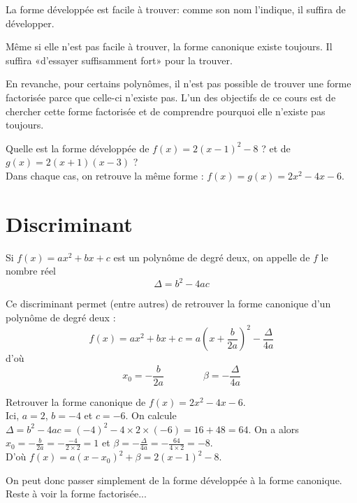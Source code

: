 \documentclass[cours]{lycee-deveaux}
\begin{document}
La forme développée est facile à trouver:
comme son nom l'indique, il suffira de développer.

Même si elle n'est pas facile à trouver, la forme canonique existe toujours.
Il suffira «d'essayer suffisamment fort» pour la trouver.

En revanche, pour certains polynômes, il n'est pas possible de trouver une forme
factorisée parce que celle-ci n'existe pas. L'un des objectifs de ce cours
est de chercher cette forme factorisée et de comprendre pourquoi elle n'existe pas toujours.

\begin{exemple}
  Quelle est la forme développée de  $f(x)= 2(x-1)^2-8$ ?
  et de $g(x) = 2(x+1)(x-3)$ ?\\
  Dans chaque cas, on retrouve la même forme : $f(x) = g(x) = 2x^2-4x-6$.
\end{exemple}

%
%
%
%
%
\section{Discriminant}

\begin{definition}
  \label{definition-discriminant}
  Si $f(x) = ax^2+bx+c$ est un polynôme de degré deux, on appelle
   de $f$ le nombre réel
  \[
  \Delta = b^2-4ac
  \]
\end{definition}

Ce discriminant permet (entre autres) de retrouver la forme canonique 
d'un polynôme de degré deux :
\[
f(x) = ax^2+bx+c = a\left(x+\frac{b}{2a}\right)^2-\frac{\Delta}{4a}
\]
d'où 
\[
x_0 = -\frac{b}{2a} \qquad \qquad \beta = -\frac{\Delta}{4a}
\]

\begin{exemple}
  Retrouver la forme canonique de $f(x) = 2x^2-4x-6$.\\
  Ici, $a=2$, $b=-4$ et $c=-6$. On calcule $\Delta = b^2-4ac = (-4)^2-4\times 2\times (-6) = 16+48=64$.
  On a alors $x_0 = -\frac{b}{2a} = -\frac{-4}{2\times 2} = 1$ et
  $\beta = -\frac{\Delta}{4a} = -\frac{64}{4\times 2} = -8$.\\
  D'où $f(x) = a(x-x_0)^2+\beta = 2(x-1)^2-8$.
\end{exemple}

On peut donc passer simplement de la forme développée à la forme canonique.
Reste à voir la forme factorisée...
\end{document}
